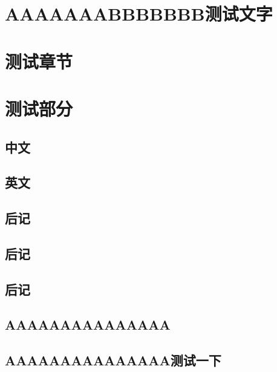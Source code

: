 \documentclass[color=yellow,openany]{textbook-cn}%
\begin{document}
\backmatter


\part*{AAAAAAABBBBBBB测试文字}
\part{测试章节}
\part[宝贝儿]{测试部分}


\lipsum

\begin{Appendix}

\chapter[PPPPPLLL]{中文}
\thepart\zhlipsum

\chapter{英文}
\zhlipsum
\end{Appendix}



\chapter{后记}
\thechapter
\zhlipsum\zhlipsum
\chapter[我爱你]{后记}
\thechapter
\zhlipsum\zhlipsum
\chapter*{后记}



\chapter*[我讨厌你]{AAAAAAAAAAAAAAA}
\zhlipsum\zhlipsum

\chapter*{AAAAAAAAAAAAAAA测试一下}
\end{document}
